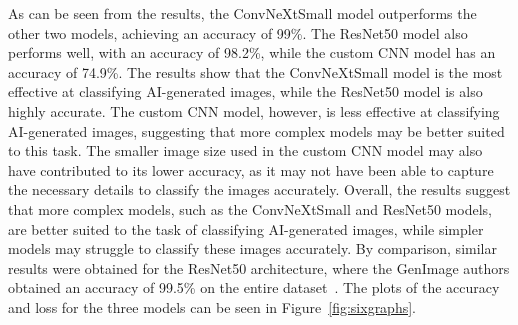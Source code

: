 \documentclass[runningheads]{llncs}
\begin{document}
As can be seen from the results, the ConvNeXtSmall model outperforms the other two models, achieving an accuracy of 99\%. The ResNet50 model also performs well, with an accuracy of 98.2\%, while the custom CNN model has an accuracy of 74.9\%. The results show that the ConvNeXtSmall model is the most effective at classifying AI-generated images, while the ResNet50 model is also highly accurate. The custom CNN model, however, is less effective at classifying AI-generated images, suggesting that more complex models may be better suited to this task. The smaller image size used in the custom CNN model may also have contributed to its lower accuracy, as it may not have been able to capture the necessary details to classify the images accurately. Overall, the results suggest that more complex models, such as the ConvNeXtSmall and ResNet50 models, are better suited to the task of classifying AI-generated images, while simpler models may struggle to classify these images accurately. By comparison, similar results were obtained for the ResNet50 architecture, where the GenImage authors obtained an accuracy of 99.5\%  on the entire dataset~\cite{zhu2023genimagesupp}. The plots of the accuracy and loss for the three models can be seen in Figure~\ref{fig:sixgraphs}.
\end{document}
